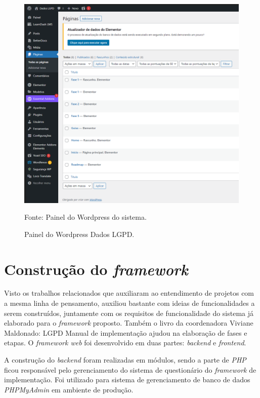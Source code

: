 \documentclass[
	12pt,				%
	openright,			%
	oneside,			%
	a4paper,			%
	english,			%
	french,				%
	spanish,			%
	brazil,				%
	]{abntex2}
\begin{document}
\begin{figure}[ht]
    \centering
    \caption{Painel do Wordpress Dados LGPD.}
    \includegraphics[width=6.0in, ]{Images/wordpress.png}
    \label{fig: grafico-acc}

    \centering \small Fonte: Painel do Wordpress do sistema.
\end{figure}





\section{Construção do \textit{framework} }


Visto os trabalhos relacionados que auxiliaram ao entendimento de projetos com a mesma linha de pensamento, auxiliou bastante com ideias de funcionalidades a serem construídos, juntamente com os requisitos de funcionalidade do sistema já elaborado para o \textit{framework} proposto. Também o livro da coordenadora Viviane Maldonado: LGPD Manual de implementação ajudou na elaboração de fases e etapas.
O \textit{framework web} foi desenvolvido em duas partes: \textit{backend} e \textit{frontend}.  

A construção do \textit{backend} foram realizadas em módulos, sendo a parte de \textit{PHP} ficou responsável pelo gerenciamento do sistema de questionário do \textit{framework} de implementação. Foi utilizado para sistema de gerenciamento de banco de dados \textit{PHPMyAdmin} em ambiente de produção.
\end{document}
